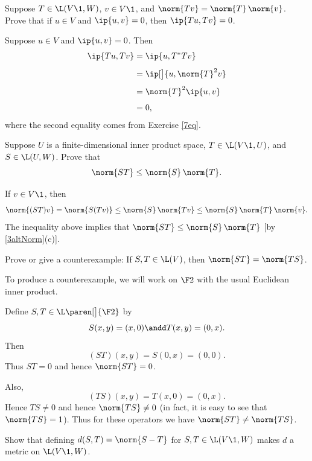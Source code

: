 \exercise
Suppose $T \in \L(V\1, W)$, $v \in V\1$, and $\norm{Tv} = \norm{T} \, \norm{v}$. Prove that if $u \in V$ and $\ip{u, v} = 0$, then
$\ip{Tu, Tv} = 0$.

\begin{Solution}
Suppose $u \in V$ and $\ip{u, v} = 0$. Then
\begin{align*}
\ip{Tu, Tv} &= \ip{u, T^* T v} \\[4bp]
&= \ip[\big]{ u, \norm{T}^2 v } \\[4bp]
&= \norm{T}^2 \ip{u, v} \\[4bp]
&= 0,
\end{align*}
where the second equality comes from Exercise \ref{7eq}.
\end{Solution}

\exercise
Suppose $U$ is a finite-dimensional inner product space, $T \in \L(V\1, U)$, and $S \in \L(U, W)$. Prove that \label{2prod}
\[
\norm{ST} \le \norm{S} \, \norm{T}.
\]
\exercisedisplayend

\begin{Solution}
If $v \in V\1$, then
\[
\norm{(ST)v} = \norm{S(Tv)} \le \norm{S} \, \norm{Tv} \le \norm{S} \, \norm{T} \, \norm{v}.
\]
The inequality above implies that $\norm{ST} \le \norm{S} \, \norm {T}$ [by \ref{3altNorm}(c)].
\end{Solution}

\exercise
Prove or give a counterexample: If $S, T \in \L(V)$, then $\norm{ST} = \norm{TS}$.

\begin{Solution}
To produce a counterexample, we will work on $\F 2$ with the usual Euclidean inner product.

Define $S, T \in \L\paren[\big]{\F 2}$ by
\[
S(x, y) = (x, 0) \andd T(x,y) = (0, x).
\]
Then
\[
(ST)(x,y) = S(0,x) = (0, 0).
\]
Thus $ST = 0$ and hence $\norm{ST} = 0$.

Also,
\[
(TS)(x,y) = T(x,0) = (0,x).
\]
Hence $TS \ne 0$ and hence $\norm{TS} \ne 0$ (in fact, it is easy to see that $\norm{TS} = 1$). Thus for these operators we have $\norm{ST} \ne \norm{TS}$.
\end{Solution}

\exercise
Show that defining $d(S, T) = \norm{S-T}$ for $S, T \in \L(V\1, W)$ makes $d$ a metric on $\L(V\1, W)$.\label{7met}

